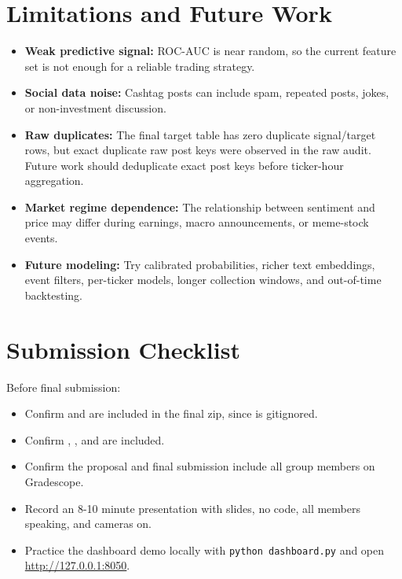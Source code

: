 \documentclass[11pt]{article}
\begin{document}
\section{Limitations and Future Work}

\begin{itemize}
    \item \textbf{Weak predictive signal:} ROC-AUC is near random, so the current feature set is not enough for a reliable trading strategy.
    \item \textbf{Social data noise:} Cashtag posts can include spam, repeated posts, jokes, or non-investment discussion.
    \item \textbf{Raw duplicates:} The final target table has zero duplicate signal/target rows, but exact duplicate raw post keys were observed in the raw audit. Future work should deduplicate exact post keys before ticker-hour aggregation.
    \item \textbf{Market regime dependence:} The relationship between sentiment and price may differ during earnings, macro announcements, or meme-stock events.
    \item \textbf{Future modeling:} Try calibrated probabilities, richer text embeddings, event filters, per-ticker models, longer collection windows, and out-of-time backtesting.
\end{itemize}

\section{Submission Checklist}

Before final submission:

\begin{itemize}
    \item Confirm  and  are included in the final zip, since  is gitignored.
    \item Confirm , , and  are included.
    \item Confirm the proposal and final submission include all group members on Gradescope.
    \item Record an 8-10 minute presentation with slides, no code, all members speaking, and cameras on.
    \item Practice the dashboard demo locally with \texttt{python dashboard.py} and open \url{http://127.0.0.1:8050}.
\end{itemize}
\end{document}
